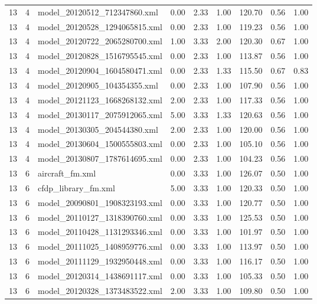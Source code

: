 \begin{table}[ht]
\begin{tabular}{rrlrrrrrr}
   13 &   4 & model\_20120512\_712347860.xml & 0.00 & 2.33 & 1.00 & 120.70 & 0.56 & 1.00 \\ 
   13 &   4 & model\_20120528\_1294065815.xml & 0.00 & 2.33 & 1.00 & 119.23 & 0.56 & 1.00 \\ 
   13 &   4 & model\_20120722\_2065280700.xml & 1.00 & 3.33 & 2.00 & 120.30 & 0.67 & 1.00 \\ 
   13 &   4 & model\_20120828\_1516795545.xml & 0.00 & 2.33 & 1.00 & 113.87 & 0.56 & 1.00 \\ 
   13 &   4 & model\_20120904\_1604580471.xml & 0.00 & 2.33 & 1.33 & 115.50 & 0.67 & 0.83 \\ 
   13 &   4 & model\_20120905\_104354355.xml & 0.00 & 2.33 & 1.00 & 107.90 & 0.56 & 1.00 \\ 
   13 &   4 & model\_20121123\_1668268132.xml & 2.00 & 2.33 & 1.00 & 117.33 & 0.56 & 1.00 \\ 
   13 &   4 & model\_20130117\_2075912065.xml & 5.00 & 3.33 & 1.33 & 120.63 & 0.56 & 1.00 \\ 
   13 &   4 & model\_20130305\_204544380.xml & 2.00 & 2.33 & 1.00 & 120.00 & 0.56 & 1.00 \\ 
   13 &   4 & model\_20130604\_1500555803.xml & 0.00 & 2.33 & 1.00 & 105.10 & 0.56 & 1.00 \\ 
   13 &   4 & model\_20130807\_1787614695.xml & 0.00 & 2.33 & 1.00 & 104.23 & 0.56 & 1.00 \\ 
   13 &   6 & aircraft\_fm.xml & 0.00 & 3.33 & 1.00 & 126.07 & 0.50 & 1.00 \\ 
   13 &   6 & cfdp\_library\_fm.xml & 5.00 & 3.33 & 1.00 & 120.33 & 0.50 & 1.00 \\ 
   13 &   6 & model\_20090801\_1908323193.xml & 0.00 & 3.33 & 1.00 & 120.77 & 0.50 & 1.00 \\ 
   13 &   6 & model\_20110127\_1318390760.xml & 0.00 & 3.33 & 1.00 & 125.53 & 0.50 & 1.00 \\ 
   13 &   6 & model\_20110428\_1131293346.xml & 0.00 & 3.33 & 1.00 & 101.97 & 0.50 & 1.00 \\ 
   13 &   6 & model\_20111025\_1408959776.xml & 0.00 & 3.33 & 1.00 & 113.97 & 0.50 & 1.00 \\ 
   13 &   6 & model\_20111129\_1932950448.xml & 0.00 & 3.33 & 1.00 & 116.17 & 0.50 & 1.00 \\ 
   13 &   6 & model\_20120314\_1438691117.xml & 0.00 & 3.33 & 1.00 & 105.33 & 0.50 & 1.00 \\ 
   13 &   6 & model\_20120328\_1373483522.xml & 2.00 & 3.33 & 1.00 & 109.80 & 0.50 & 1.00 \\ 

\end{tabular}
\end{table}
